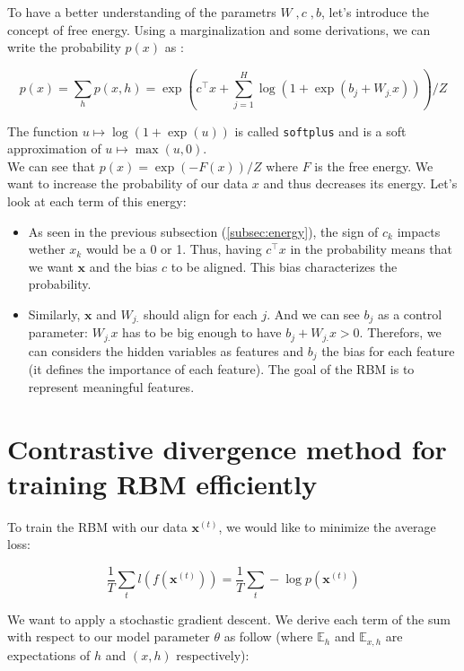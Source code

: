 \documentclass{article}
\begin{document}
To have a better understanding of the parametrs $W \;, c \;, b$, let's introduce the concept of free energy. Using a marginalization and some derivations, we can write the probability $p(x)$ as :

\[ p(x) = \sum_h p(x,h) = \exp\left(c^\top x + \sum_{j=1}^H \log\left( 1+\exp(b_j + W_{j.}x) \right) \right) / Z \]

The function $u \mapsto \log\left( 1+\exp(u) \right)$ is called \texttt{softplus} and is a soft approximation of $u \mapsto \max(u,0)$. \\

We can see that $p(x) = \exp\left(-F(x)\right) / Z$ where $F$ is the free energy. We want to increase the probability of our data $x$ and thus decreases its energy. Let's look at each term of this energy:

\begin{itemize}
    \item As seen in the previous subsection (\ref{subsec:energy}), the sign of $c_k$ impacts wether $x_k$ would be a 0 or 1. Thus, having $c^\top x$ in the probability means that we want $\mathbf{x}$ and the bias $c$ to be aligned. This bias characterizes the probability.
    \item Similarly, $\mathbf{x}$ and $W_{j.}$ should align for each $j$. And we can see $b_j$ as a control parameter: $W_{j.}x$ has to be big enough to have $b_j + W_{j.}x > 0 $.  Therefors, we can considers the hidden variables as features and $b_j$ the bias for each feature (it defines the importance of each feature). The goal of the RBM is to represent meaningful features.
\end{itemize}


\section{Contrastive divergence method for training RBM efficiently}

To train the RBM with our data $\mathbf{x}^{(t)}$, we would like to minimize the average loss:

\[ \frac{1}{T} \sum_t l(f(\mathbf{x}^{(t)})) =  \frac{1}{T} \sum_t - \log p(\mathbf{x}^{(t)}) \]

We want to apply a stochastic gradient descent. We derive each term of the sum with respect to our model parameter $\theta$ as follow (where $\mathbb{E}_h$ and $\mathbb{E}_{x,h}$ are expectations of $h$ and $(x,h)$ respectively):
\end{document}
